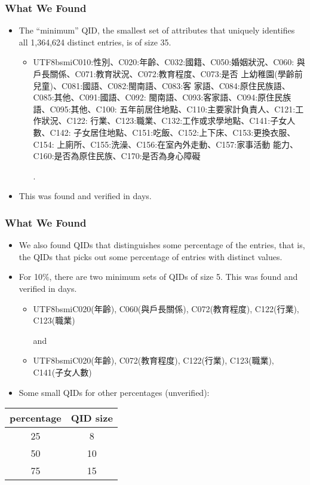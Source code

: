 \documentclass{beamer}
\newcommand{\cjk}[1]{\begin{CJK}{UTF8}{bsmi}#1\end{CJK}}
\begin{document}
\begin{frame}
    \frametitle{What We Found}
    \begin{itemize}
        \item The ``minimum'' QID, the smallest set of attributes that uniquely identifies all 1,364,624 distinct entries, is of size 35.
        \begin{itemize}
            \item \cjk{C010:性別、C020:年齡、C032:國籍、C050:婚姻狀況、C060: 與戶長關係、C071:教育狀況、C072:教育程度、C073:是否 上幼稚園(學齡前兒童)、C081:國語、C082:閩南語、C083:客 家語、C084:原住民族語、C085:其他、C091:國語、C092: 閩南語、C093:客家語、C094:原住民族語、C095:其他、C100: 五年前居住地點、C110:主要家計負責人、C121:工作狀況、C122: 行業、C123:職業、C132:工作或求學地點、C141:子女人數、C142: 子女居住地點、C151:吃飯、C152:上下床、C153:更換衣服、C154: 上廁所、C155:洗澡、C156:在室內外走動、C157:家事活動 能力、C160:是否為原住民族、C170:是否為身心障礙}.
        \end{itemize}
        \item This was found and verified in days.
    \end{itemize}
\end{frame}

\begin{frame}
    \frametitle{What We Found}
    \begin{itemize}
        \item We also found QIDs that distinguishes some percentage of the entries, that is, the QIDs that picks out some percentage of entries with distinct values.
        \item For 10\%, there are two minimum sets of QIDs of size 5. This was found and verified in days.
        \begin{itemize}
            \item \cjk{C020(年齡), C060(與戶長關係), C072(教育程度), C122(行業), C123(職業)} and
            \item \cjk{C020(年齡), C072(教育程度), C122(行業), C123(職業), C141(子女人數)}
        \end{itemize}
        \item Some small QIDs for other percentages (unverified):
    \end{itemize}
    \begin{center}
        \begin{tabular}{ c|c }
        percentage & QID size \\
        \hline
        25 & 8 \\
        50 & 10\\
        75 & 15\\
        \end{tabular}
    \end{center}
\end{frame}
\end{document}
